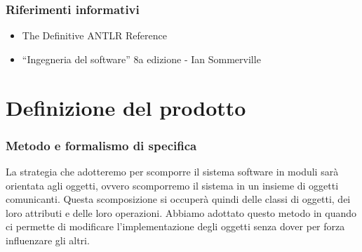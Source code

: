 \documentclass[11pt,titlepage,a4paper]{report}
\begin{document}
\subsection{Riferimenti informativi}
\begin{itemize}
\item The Definitive ANTLR Reference
\item ``Ingegneria del software'' 8a edizione - Ian Sommerville
\end{itemize}

\chapter{Definizione del prodotto}
\subsection{Metodo e formalismo di specifica}
La strategia che adotteremo per scomporre il sistema software in moduli sar\`a orientata agli oggetti, ovvero scomporremo il sistema in un insieme di oggetti comunicanti. Questa scomposizione si occuper\`a quindi delle classi di oggetti, dei loro attributi e delle loro operazioni. Abbiamo adottato questo metodo in quando ci permette di modificare l'implementazione degli oggetti senza dover per forza influenzare gli altri.
\end{document}

